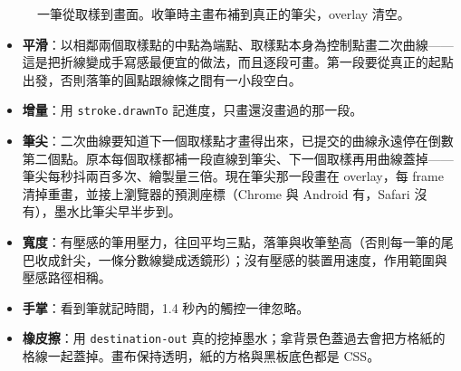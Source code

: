 \documentclass[11pt,a4paper,oneside]{report}
\renewcommand{\_}{\ifmmode\origunderscore\else\textunderscore\allowbreak\fi}
\newcommand{\code}[1]{\texttt{#1}}
\begin{document}
\begin{figure}[h]
\centering
{}
\caption{一筆從取樣到畫面。收筆時主畫布補到真正的筆尖，overlay 清空。}
\end{figure}

\begin{itemize}
  \item \textbf{平滑}：以相鄰兩個取樣點的中點為端點、取樣點本身為控制點畫二次曲線——這是把折線變成手寫感最便宜的做法，而且逐段可畫。第一段要從真正的起點出發，否則落筆的圓點跟線條之間有一小段空白。
  \item \textbf{增量}：用 \code{stroke.drawnTo} 記進度，只畫還沒畫過的那一段。
  \item \textbf{筆尖}：二次曲線要知道下一個取樣點才畫得出來，已提交的曲線永遠停在倒數第二個點。原本每個取樣都補一段直線到筆尖、下一個取樣再用曲線蓋掉——筆尖每秒抖兩百多次、繪製量三倍。現在筆尖那一段畫在 overlay，每 frame 清掉重畫，並接上瀏覽器的預測座標（Chrome 與 Android 有，Safari 沒有），墨水比筆尖早半步到。
  \item \textbf{寬度}：有壓感的筆用壓力，往回平均三點，落筆與收筆墊高（否則每一筆的尾巴收成針尖，一條分數線變成透鏡形）；沒有壓感的裝置用速度，作用範圍與壓感路徑相稱。
  \item \textbf{手掌}：看到筆就記時間，1.4 秒內的觸控一律忽略。
  \item \textbf{橡皮擦}：用 \code{destination-out} 真的挖掉墨水；拿背景色蓋過去會把方格紙的格線一起蓋掉。畫布保持透明，紙的方格與黑板底色都是 CSS。
\end{itemize}
\end{document}
